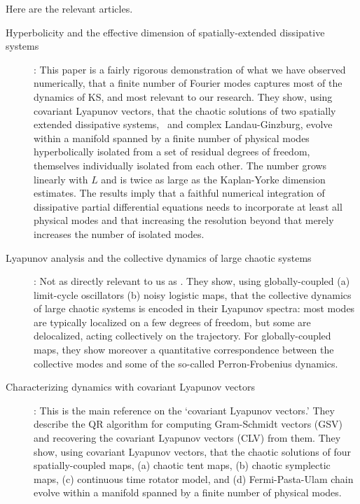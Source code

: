  Here are the relevant articles.

\begin{description}
\item[Hyperbolicity and the effective dimension of
           spatially-extended dissipative systems]:
  This paper is a fairly rigorous demonstration of what we
  have observed numerically, that a finite number of Fourier modes
  captures most of the dynamics of KS, and most relevant to our research.
 They show, using covariant Lyapunov vectors, that
  the chaotic solutions of two spatially extended dissipative
  systems, \KS\ and complex Landau-Ginzburg,
  evolve within a manifold spanned by a finite number
  of physical modes hyperbolically isolated from a set of
  residual degrees of freedom, themselves individually
  isolated from each other. The number grows linearly with
  $L$ and is twice as large as the Kaplan-Yorke dimension estimates.
  The results imply that a
  faithful numerical integration of dissipative
  partial differential equations needs to incorporate at
  least all physical modes and that increasing the resolution
  beyond that
  merely increases the number of isolated modes.

\item[Lyapunov analysis and the collective dynamics of
           large chaotic systems]:
  Not as directly relevant to us as .
  They show, using globally-coupled
  (a) limit-cycle oscillators
  (b) noisy logistic maps,
  that the collective dynamics of large chaotic
  systems is encoded in their Lyapunov spectra: most modes
  are typically localized on a few degrees of freedom, but
  some are delocalized, acting collectively on the
  trajectory. For globally-coupled maps, they show moreover a
  quantitative correspondence between the collective modes
  and some of the so-called Perron-Frobenius dynamics.

\item[Characterizing dynamics with covariant Lyapunov
              vectors]:
This is the main reference on the
`covariant Lyapunov vectors.' They describe the QR algorithm for
computing Gram-Schmidt vectors (GSV) and recovering
the covariant Lyapunov vectors (CLV) from them.
They show, using covariant Lyapunov vectors, that
  the chaotic solutions of four spatially-coupled maps,
(a) chaotic tent maps,
(b) chaotic symplectic maps,
(c) continuous time rotator model, and
(d) Fermi-Pasta-Ulam chain
  evolve within a manifold spanned by a finite number
  of physical modes.


\end{description}
